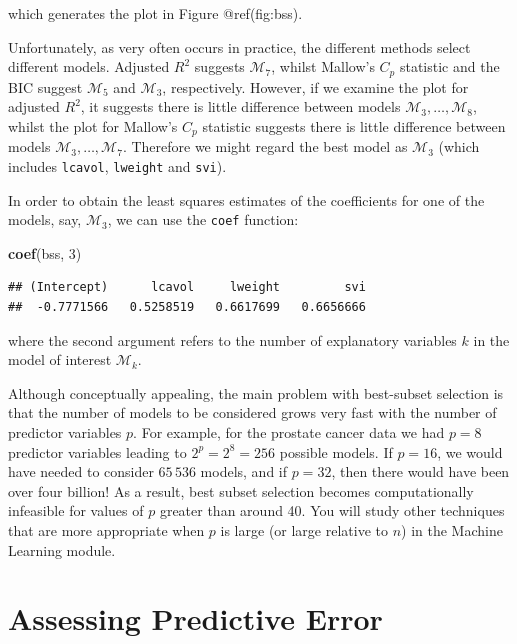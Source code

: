 \documentclass[
]{article}
\newenvironment{Shaded}{\begin{snugshade}}{\end{snugshade}}
\newcommand{\DecValTok}[1]{\textcolor[rgb]{0.00,0.00,0.81}{#1}}
\newcommand{\FunctionTok}[1]{\textcolor[rgb]{0.13,0.29,0.53}{\textbf{#1}}}
\newcommand{\NormalTok}[1]{#1}
\begin{document}
which generates the plot in Figure @ref(fig:bss).

Unfortunately, as very often occurs in practice, the different methods
select different models. Adjusted \(R^2\) suggests \(\mathcal{M}_7\),
whilst Mallow's \(C_p\) statistic and the BIC suggest \(\mathcal{M}_5\)
and \(\mathcal{M}_3\), respectively. However, if we examine the plot for
adjusted \(R^2\), it suggests there is little difference between models
\(\mathcal{M}_3, \ldots, \mathcal{M}_8\), whilst the plot for Mallow's
\(C_p\) statistic suggests there is little difference between models
\(\mathcal{M}_3, \ldots, \mathcal{M}_7\). Therefore we might regard the
best model as \(\mathcal{M}_3\) (which includes \texttt{lcavol},
\texttt{lweight} and \texttt{svi}).

In order to obtain the least squares estimates of the coefficients for
one of the models, say, \(\mathcal{M}_3\), we can use the \texttt{coef}
function:

\begin{Shaded}
\begin{Highlighting}[]
\FunctionTok{coef}\NormalTok{(bss, }\DecValTok{3}\NormalTok{)}
\end{Highlighting}
\end{Shaded}

\begin{verbatim}
## (Intercept)      lcavol     lweight         svi 
##  -0.7771566   0.5258519   0.6617699   0.6656666
\end{verbatim}

where the second argument refers to the number of explanatory variables
\(k\) in the model of interest \(\mathcal{M}_k\).

Although conceptually appealing, the main problem with best-subset
selection is that the number of models to be considered grows very fast
with the number of predictor variables \(p\). For example, for the
prostate cancer data we had \(p=8\) predictor variables leading to
\(2^p = 2^8 = 256\) possible models. If \(p=16\), we would have needed
to consider \(65 \, 536\) models, and if \(p=32\), then there would have
been over four billion! As a result, best subset selection becomes
computationally infeasible for values of \(p\) greater than around 40.
You will study other techniques that are more appropriate when \(p\) is
large (or large relative to \(n\)) in the Machine Learning module.

\hypertarget{assessing-predictive-error}{%
\section{Assessing Predictive Error}\label{assessing-predictive-error}}
\end{document}
